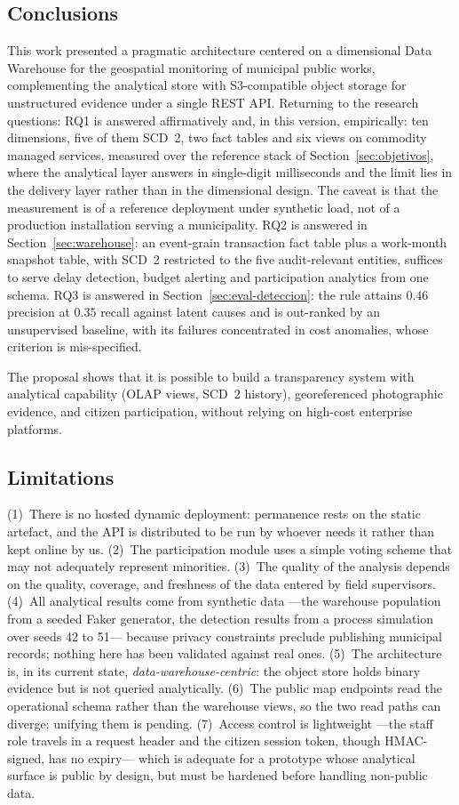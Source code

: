 \documentclass[runningheads]{llncs}
\renewcommand{\_}{\origunderscore\allowbreak}
\begin{document}
\subsection{Conclusions}
This work presented a pragmatic architecture centered on a dimensional Data Warehouse for the geospatial monitoring of municipal public works, complementing the analytical store with S3-compatible object storage for unstructured evidence under a single REST API. Returning to the research questions: RQ1 is answered affirmatively and, in this version, empirically: ten dimensions, five of them SCD~2, two fact tables and six views on commodity managed services, measured over the reference stack of Section~\ref{sec:objetivos}, where the analytical layer answers in single-digit milliseconds and the limit lies in the delivery layer rather than in the dimensional design. The caveat is that the measurement is of a reference deployment under synthetic load, not of a production installation serving a municipality. RQ2 is answered in Section~\ref{sec:warehouse}: an event-grain transaction fact table plus a work-month snapshot table, with SCD~2 restricted to the five audit-relevant entities, suffices to serve delay detection, budget alerting and participation analytics from one schema. RQ3 is answered in Section~\ref{sec:eval-deteccion}: the rule attains $0.46$ precision at $0.35$ recall against latent causes and is out-ranked by an unsupervised baseline, with its failures concentrated in cost anomalies, whose criterion is mis-specified.

The proposal shows that it is possible to build a transparency system with analytical capability (OLAP views, SCD~2 history), georeferenced photographic evidence, and citizen participation, without relying on high-cost enterprise platforms.

\subsection{Limitations}
\label{sec:limitaciones}
(1)~There is no hosted dynamic deployment: permanence rests on the static artefact, and the API is distributed to be run by whoever needs it rather than kept online by us. (2)~The participation module uses a simple voting scheme that may not adequately represent minorities. (3)~The quality of the analysis depends on the quality, coverage, and freshness of the data entered by field supervisors. (4)~All analytical results come from synthetic data ---the warehouse population from a seeded Faker generator, the detection results from a process simulation over seeds 42 to 51--- because privacy constraints preclude publishing municipal records; nothing here has been validated against real ones. (5)~The architecture is, in its current state, \emph{data-warehouse-centric}: the object store holds binary evidence but is not queried analytically. (6)~The public map endpoints read the operational schema rather than the warehouse views, so the two read paths can diverge; unifying them is pending. (7)~Access control is lightweight ---the staff role travels in a request header and the citizen session token, though HMAC-signed, has no expiry--- which is adequate for a prototype whose analytical surface is public by design, but must be hardened before handling non-public data.
\end{document}
